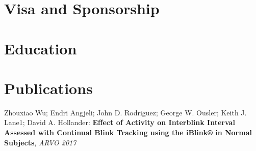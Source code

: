 \documentclass[12pt,a4paper,merriweather]{moderncv}        %
\begin{document}

\section{Visa and Sponsorship}


\section{Education}

\section{Publications}
\small Zhouxiao Wu; Endri Angjeli; John D. Rodriguez; George W. Ousler; Keith J. Lane1; David A. Hollander: \textbf{Effect of Activity on Interblink Interval Assessed with Continual Blink Tracking using the iBlink® in Normal Subjects}, \textit{ARVO 2017}

\clearpage





\end{document}
